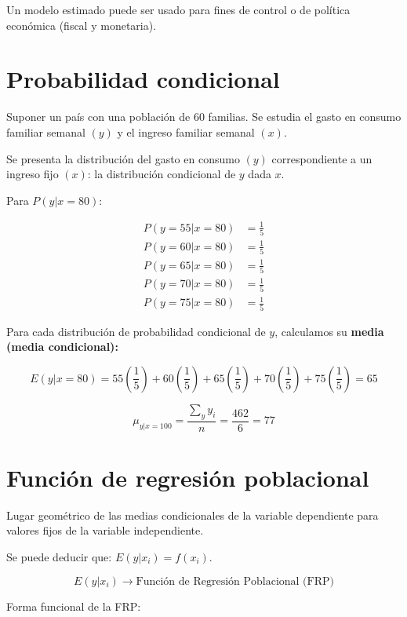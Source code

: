 \documentclass[
]{book}
\begin{document}
Un modelo estimado puede ser usado para fines de control o de política económica (fiscal y monetaria).

\hypertarget{probabilidad-condicional}{%
\section{Probabilidad condicional}\label{probabilidad-condicional}}

Suponer un país con una población de 60 familias. Se estudia el gasto en consumo familiar semanal \((y)\) y el ingreso familiar semanal \((x)\).

Se presenta la distribución del gasto en consumo \((y)\) correspondiente a un ingreso fijo \((x)\): la distribución condicional de \(y\) dada \(x\).

Para \(P(y|x = 80)\):

\[ 
\begin{aligned} 
P(y=55|x=80) &= \frac{1}{5} \\ 
P(y=60|x=80) &= \frac{1}{5} \\ 
P(y=65|x=80) &= \frac{1}{5} \\ 
P(y=70|x=80) &= \frac{1}{5} \\ 
P(y=75|x=80) &= \frac{1}{5} 
\end{aligned} 
\]

Para cada distribución de probabilidad condicional de \(y\), calculamos su \textbf{media (media condicional):}

\[ 
E(y|x=80) = 55\left( \frac{1}{5} \right) + 60\left( \frac{1}{5} \right) + 65\left( \frac{1}{5} \right) + 70\left( \frac{1}{5} \right) + 75\left( \frac{1}{5} \right) = 65
\]

\[
\mu_{y|x=100} = \frac{\sum_{y}y_{i}}{n} = \frac{462}{6} = 77
\]

\hypertarget{funciuxf3n-de-regresiuxf3n-poblacional}{%
\section{Función de regresión poblacional}\label{funciuxf3n-de-regresiuxf3n-poblacional}}

Lugar geométrico de las medias condicionales de la variable dependiente para valores fijos de la variable independiente.

Se puede deducir que: \(E(y|x_i) = f(x_i)\).

\[
E(y|x_i) \rightarrow \text{Función de Regresión Poblacional (FRP)}
\]

Forma funcional de la FRP:
\end{document}
